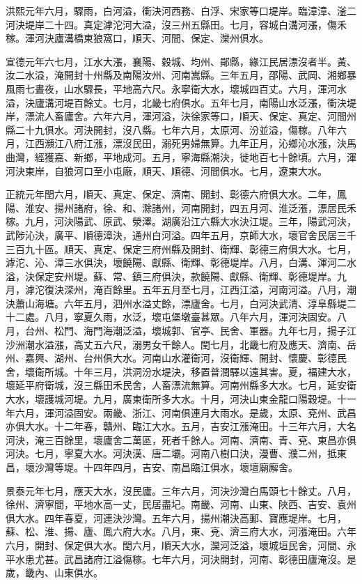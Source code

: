 \begin{pinyinscope}
洪熙元年六月，驟雨，白河溢，衝決河西務、白浮、宋家等口堤岸。臨漳漳、滏二河決堤岸二十四。真定滹沱河大溢，沒三州五縣田。七月，容城白溝河漲，傷禾稼。渾河決廬溝橋東狼窩口，順天、河間、保定、灤州俱水。

宣德元年六七月，江水大漲，襄陽、穀城、均州、鄖縣，緣江民居漂沒者半。黃、汝二水溢，淹開封十州縣及南陽汝州、河南嵩縣。三年五月，邵陽、武岡、湘鄉暴風雨七晝夜，山水驟長，平地高六尺。永寧衛大水，壞城四百丈。六月，渾河水溢，決廬溝河堤百餘丈。七月，北畿七府俱水。五年七月，南陽山水泛漲，衝決堤岸，漂流人畜廬舍。六年六月，渾河溢，決徐家等口，順天、保定、真定、河間州縣二十九俱水。河決開封，沒八縣。七年六月，太原河、汾並溢，傷稼。八年六月，江西瀕江八府江漲，漂沒民田，溺死男婦無算。九年正月，沁鄉沁水漲，決馬曲灣，經獲嘉、新鄉，平地成河。五月，寧海縣潮決，徙地百七十餘頃。六月，渾河決東岸，自狼河口至小屯廠，順天、順德、河間俱水。七月，遼東大水。

正統元年閏六月，順天、真定、保定、濟南、開封、彰德六府俱大水。二年，鳳陽、淮安、揚州諸府，徐、和、滁諸州，河南開封，四五月河、淮泛漲，漂居民禾稼。九月，河決陽武、原武、滎澤。湖廣沿江六縣大水決江堤。三年，陽武河決，武陟沁決，廣平、順德漳決，通州白河溢。四年五月，京師大水，壞官舍民居三千三百九十區。順天、真定、保定三府州縣及開封、衛輝、彰德三府俱大水。七月，滹沱、沁、漳三水俱決，壞饒陽、獻縣、衛輝、彰德堤岸。八月，白溝、渾河二水溢，決保定安州堤。蘇、常、鎮三府俱決，款饒陽、獻縣、衛輝、彰德堤岸。九月，滹沱復決深州，淹百餘里。五年五月至七月，江西江溢，河南河溢。八月，潮決蕭山海塘。六年五月，泗州水溢丈餘，漂廬舍。七月，白河決武清、淳阜縣堤二十二處。八月，寧夏久雨，水泛，壞屯堡墩臺甚眾。八年六月，渾河決固安。八月，台州、松門、海門海潮泛溢，壞城郭、官亭、民舍、軍器。九年七月，揚子江沙洲潮水溢漲，高丈五六尺，溺男女千餘人。閏七月，北畿七府及應天、濟南、岳州、嘉興、湖州、台州俱大水。河南山水灌衛河，沒衛輝、開封、懷慶、彰德民舍，壞衛所城。十年三月，洪洞汾水堤決，移置普潤驛以遠其害。夏，福建大水，壞延平府衛城，沒三縣田禾民舍，人畜漂流無算。河南州縣多大水。七月，延安衛大水，壞護城河堤。九月，廣東衛所多大水。十月，河決山東金龍口陽穀堤。十一年六月，渾河溢固安。兩畿、浙江、河南俱連月大雨水。是歲，太原、兗州、武昌亦俱大水。十二年春，贛州、臨江大水。五月，吉安江漲淹田。十三年六月，大名河決，淹三百餘里，壞廬舍二萬區，死者千餘人。河南、濟南、青、兗、東昌亦俱河決。七月，寧夏大水。河決漢、唐二壩。河南八樹口決，漫曹、濮二州，抵東昌，壞沙灣等堤。十四年四月，吉安、南昌臨江俱水，壞壇廟廨舍。

景泰元年七月，應天大水，沒民廬。三年六月，河決沙灣白馬頭七十餘丈。八月，徐州、濟寧間，平地水高一丈，民居盡圮。南畿、河南、山東、陜西、吉安、袁州俱大水。四年春夏，河連決沙灣。五年六月，揚州潮決高郵、寶應堤岸。七月，蘇、松、淮、揚、廬、鳳六府大水。八月，東、兗、濟三府大水，河漲淹田。六年六月，開封、保定俱大水。閏六月，順天大水，灤河泛溢，壞城垣民舍，河間、永平水患尤甚。武昌諸府江溢傷稼。七年六月，河決開封，河南、彰德田廬淹沒。是歲，畿內、山東俱水。


\end{pinyinscope}
